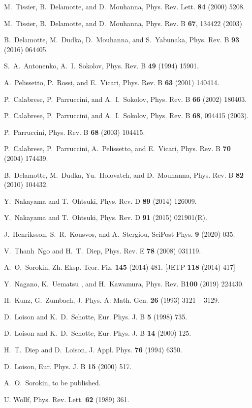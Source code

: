 \documentclass[final,twocolumn]{elsarticle}
\begin{document}
\begin{thebibliography}{00}
  M.~Tissier, B.~Delamotte, and D.~Mouhanna, Phys. Rev. Lett. {\bf 84} (2000) 5208.

  M.~Tissier, B.~Delamotte, and D.~Mouhanna, Phys. Rev. B {\bf 67}, 134422 (2003)

 B.~Delamotte, M.~Dudka, D.~Mouhanna, and S.~Yabunaka, Phys. Rev. B {\bf93} (2016) 064405.

 S.~A.~Antonenko, A.~I.~Sokolov, Phys. Rev. B {\bf 49} (1994) 15901.

 A.~Pelissetto, P.~Rossi, and E.~Vicari, Phys. Rev. B {\bf 63} (2001) 140414.

 P.~Calabrese, P.~Parruccini, and A.~I.~Sokolov, Phys. Rev. B {\bf 66} (2002) 180403.

 P.~Calabrese, P.~Parruccini, and A.~I.~Sokolov, Phys. Rev. B {\bf 68}, 094415 (2003).

 P.~Parruccini, Phys. Rev. B {\bf68} (2003) 104415.

 P.~Calabrese, P.~Parruccini, A.~Pelissetto, and E.~Vicari, Phys. Rev. B {\bf70} (2004) 174439.

 B.~Delamotte, M.~Dudka, Yu.~Holovatch, and D.~Mouhanna, Phys. Rev. B {\bf82} (2010) 104432.

 Y.~Nakayama and T.~Ohtsuki, Phys. Rev. D {\bf89} (2014) 126009.

 Y.~Nakayama and T.~Ohtsuki, Phys. Rev. D {\bf91} (2015) 021901(R).

 J.~Henriksson, S.~R.~Kousvos, and A.~Stergiou, SciPost Phys. {\bf9} (2020) 035.

 V.~Thanh~Ngo and H.~T.~Diep, Phys. Rev. E {\bf78} (2008) 031119.

 A.~O.~Sorokin, Zh. Eksp. Teor. Fiz. {\bf145} (2014) 481. [JETP {\bf118} (2014) 417]

 Y.~Nagano, K.~Uematsu , and H.~Kawamura, Phys. Rev. B{\bf100} (2019) 224430.

 H.~Kunz, G.~Zumbach, J. Phys. A: Math. Gen. {\bf26} (1993) 3121 -- 3129.

 D.~Loison and K.~D.~Schotte, Eur. Phys. J. B {\bf 5} (1998) 735.

 D.~Loison and K.~D.~Schotte, Eur. Phys. J. B {\bf 14} (2000) 125.

 H.~T.~Diep and D.~Loison, J. Appl. Phys. {\bf76} (1994) 6350.

 D.~Loison, Eur. Phys. J. B {\bf 15} (2000) 517.

 A.~O.~Sorokin, to be published.

 U. Wollf, Phys. Rev. Lett. {\bf62} (1989) 361.

\end{thebibliography}
\end{document}
